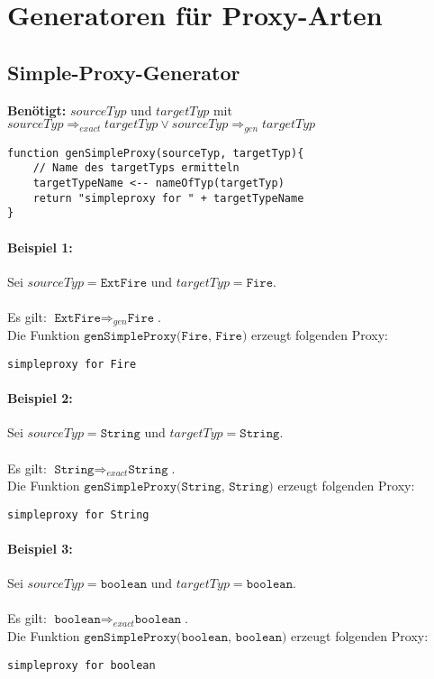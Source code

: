 \documentclass[a4paper,12pt]{article}
\begin{document}
\section{Generatoren für Proxy-Arten}
\subsection{Simple-Proxy-Generator}

\textbf{Benötigt: }$sourceTyp$ und $targetTyp$ mit $sourceTyp \Rightarrow_{exact} targetTyp \vee sourceTyp \Rightarrow_{gen} targetTyp$
\begin{lstlisting}[style = generator]
function genSimpleProxy(sourceTyp, targetTyp){
	// Name des targetTyps ermitteln
	targetTypeName <-- nameOfTyp(targetTyp)
	return "simpleproxy for " + targetTypeName
}
\end{lstlisting}


\paragraph{Beispiel 1:} Sei $sourceTyp = \texttt{ExtFire}$ und $targetTyp = \texttt{Fire}$.\\\\
Es gilt: $\texttt{ExtFire} \Rightarrow_{gen} \texttt{Fire}$.\\
Die Funktion $\texttt{genSimpleProxy(Fire, Fire)}$ erzeugt folgenden Proxy:
\begin{lstlisting}[style = dsl]
	simpleproxy for Fire
\end{lstlisting}

\paragraph{Beispiel 2:} Sei $sourceTyp = \texttt{String}$ und $targetTyp = \texttt{String}$.\\\\
Es gilt: $\texttt{String} \Rightarrow_{exact} \texttt{String}$.\\
Die Funktion $\texttt{genSimpleProxy(String, String)}$ erzeugt folgenden Proxy:
\begin{lstlisting}[style = dsl]
	simpleproxy for String
\end{lstlisting}

\paragraph{Beispiel 3:} Sei $sourceTyp = \texttt{boolean}$ und $targetTyp = \texttt{boolean}$.\\\\
Es gilt: $\texttt{boolean} \Rightarrow_{exact} \texttt{boolean}$.\\
Die Funktion $\texttt{genSimpleProxy(boolean, boolean)}$ erzeugt folgenden Proxy:
\begin{lstlisting}[style = dsl]
	simpleproxy for boolean
\end{lstlisting}
\end{document}
